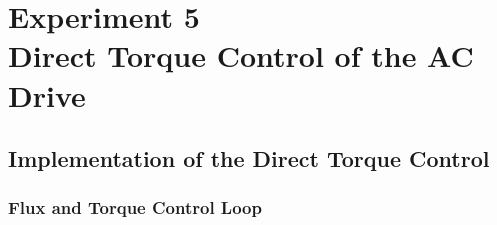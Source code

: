 \documentclass[12pt,a4paper, openany]{book}
\begin{document}




\setcounter{chapter}{4} %
\chapter{Experiment 5 \\    Direct Torque Control of the AC Drive}

 \setcounter{section}{2} %
\section{ Implementation of the Direct Torque Control}
\subsection{Flux and Torque Control Loop}
\end{document}
